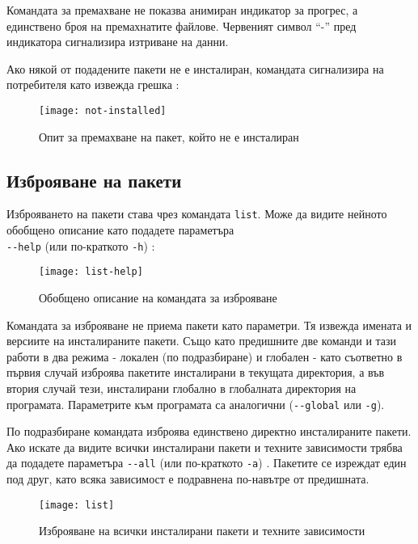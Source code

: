 Командата за премахване не показва анимиран индикатор за прогрес, а единствено
броя на премахнатите файлове. Червеният символ ``-'' пред индикатора сигнализира
изтриване на данни.

Ако някой от подадените пакети не е инсталиран, командата сигнализира на
потребителя като извежда грешка :

\begin{figure}[h]
    \centering
    \texttt{[image: not-installed]}
    \caption{Опит за премахване на пакет, който не е инсталиран}
    \label{fig:not-installed}
\end{figure}


\subsection{Изброяване на пакети}

Изброяването на пакети става чрез командата \texttt{list}. Може да видите
нейното обобщено описание като подадете параметъра \\
\texttt{-{}-help} (или по-краткото \texttt{-h}) :

\begin{figure}[H]
    \centering
    \texttt{[image: list-help]}
    \caption{Обобщено описание на командата за изброяване}
    \label{fig:list-help}
\end{figure}

Командата за изброяване не приема пакети като параметри. Тя извежда имената и
версиите на инсталираните пакети. Също като предишните две команди и тази работи
в два режима - локален (по подразбиране) и глобален - като съответно в първия
случай изброява пакетите инсталирани в текущата директория, а във втория случай
тези, инсталирани глобално в глобалната директория на програмата. Параметрите
към програмата са аналогични (\texttt{-{}-global} или \texttt{-g}).

По подразбиране командата изброява единствено директно инсталираните пакети.
Ако искате да видите всички инсталирани пакети и техните зависимости трябва да
подадете параметъра \texttt{-{}-all} (или по-краткото \texttt{-a})
. Пакетите се изреждат един под друг, като всяка зависимост е
подравнена по-навътре от предишната.

\begin{figure}[h]
    \centering
    \texttt{[image: list]}
    \caption{Изброяване на всички инсталирани пакети и техните зависимости}
    \label{fig:list}
\end{figure}



